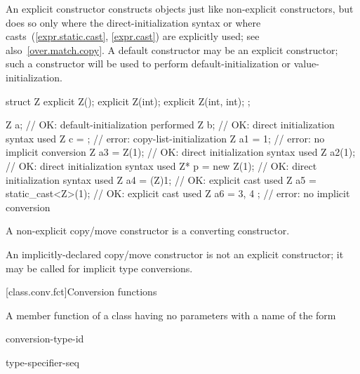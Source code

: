 \pnum
\begin{note}
An explicit constructor constructs objects just like non-explicit
constructors, but does so only where the direct-initialization syntax
or where casts~(\ref{expr.static.cast}, \ref{expr.cast}) are explicitly
used; see also~\ref{over.match.copy}.
A default constructor may be an explicit constructor; such a constructor
will be used to perform default-initialization
or value-initialization.
\begin{example}
\begin{codeblock}
struct Z {
  explicit Z();
  explicit Z(int);
  explicit Z(int, int);
};

Z a;                            // OK: default-initialization performed
Z b{};                          // OK: direct initialization syntax used
Z c = {};                       // error: copy-list-initialization
Z a1 = 1;                       // error: no implicit conversion
Z a3 = Z(1);                    // OK: direct initialization syntax used
Z a2(1);                        // OK: direct initialization syntax used
Z* p = new Z(1);                // OK: direct initialization syntax used
Z a4 = (Z)1;                    // OK: explicit cast used
Z a5 = static_cast<Z>(1);       // OK: explicit cast used
Z a6 = { 3, 4 };                // error: no implicit conversion
\end{codeblock}
\end{example}
\end{note}

\pnum
A non-explicit copy/move constructor is
a converting constructor.
\begin{note}
An implicitly-declared copy/move constructor is not an explicit constructor;
it may be called for implicit type conversions.
\end{note}

[class.conv.fct]{Conversion functions}%
%
%
%

\pnum
A member function of a class  having no parameters with a name of the form
\begin{bnf}
\br
     conversion-type-id
\end{bnf}

\begin{bnf}
\br
    type-specifier-seq 
\end{bnf}

